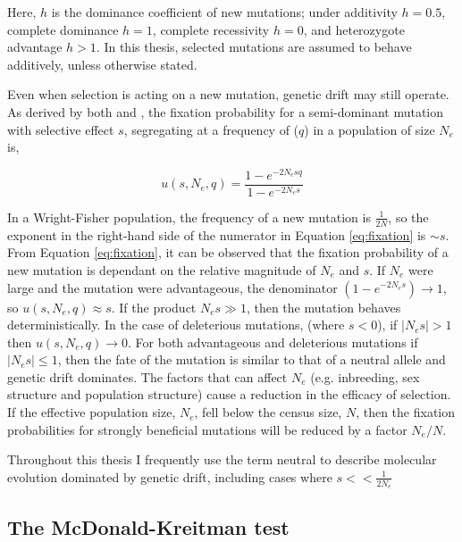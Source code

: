 \noindent
Here, $h$ is the dominance coefficient of new mutations; under additivity $h = 0.5$,  complete dominance $h = 1$, complete recessivity $h = 0$, and heterozygote advantage $h > 1$. In this thesis, selected mutations are assumed to behave additively, unless otherwise stated. 

	Even when selection is acting on a new mutation, genetic drift may still operate. As derived by both \cite{RN399} and \cite{RN199}, the fixation probability for a semi-dominant mutation with selective effect $s$, segregating at a frequency of ($q$) in a population of size $N_e$ is,

\begin{equation}
	u(s, N_e, q) = \frac{1 - e^{-2N_esq}}{1 - e^{-2N_es}}
	\label{eq:fixation}
\end{equation}

\noindent
In a Wright-Fisher population, the frequency of a new mutation is $\frac{1}{2N}$, so the exponent in the right-hand side of the numerator in Equation \ref{eq:fixation} is $\sim s$. From Equation \ref{eq:fixation}, it can be observed that the fixation probability of a new mutation is dependant on the relative magnitude of $N_e$ and $s$. If $N_e$ were large and the mutation were advantageous, the denominator $(1 - e^{-2N_es}) \to 1$, so $u(s, N_e, q) \approx s$. If the product $N_es \gg 1$, then the mutation behaves deterministically. In the case of deleterious mutations, (where $s < 0$), if $|N_es| > 1$ then $u(s, N_e, q) \to 0$.  For both advantageous and deleterious mutations if $|N_es| \leq 1$, then the fate of the mutation is similar to that of a neutral allele and genetic drift dominates. The factors that can affect $N_e$ (e.g. inbreeding, sex structure and population structure) cause a reduction in the efficacy of selection. If the effective population size, $N_e$, fell below the census size, $N$, then the fixation probabilities for strongly beneficial mutations will be reduced by a factor $N_e/N$.

	Throughout this thesis I frequently use the term neutral to describe molecular evolution dominated by genetic drift, including cases where $s << \frac{1}{2N_e}$

\subsection{The McDonald-Kreitman test}

